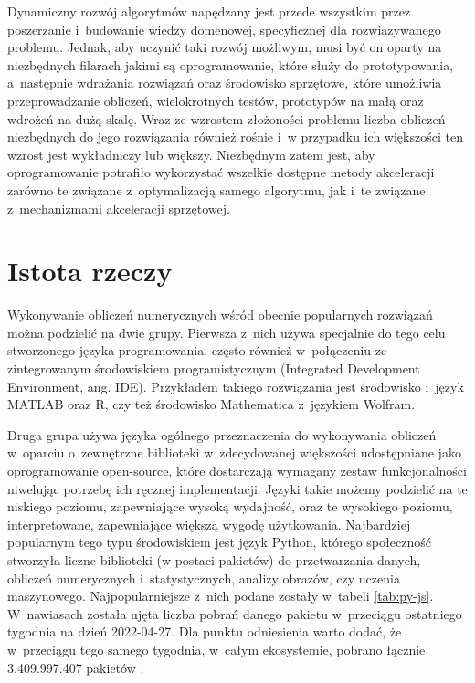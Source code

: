 Dynamiczny rozwój algorytmów napędzany jest przede wszystkim przez poszerzanie i~budowanie wiedzy domenowej, specyficznej dla rozwiązywanego problemu. Jednak, aby uczynić taki rozwój możliwym, musi być on oparty na niezbędnych filarach jakimi są oprogramowanie, które służy do prototypowania, a~następnie wdrażania rozwiązań oraz środowisko sprzętowe, które umożliwia przeprowadzanie obliczeń, wielokrotnych testów, prototypów na małą oraz wdrożeń na dużą skalę. Wraz ze wzrostem złożoności problemu liczba obliczeń niezbędnych do jego rozwiązania również rośnie i~w przypadku ich większości ten wzrost jest wykładniczy lub większy. Niezbędnym zatem jest, aby oprogramowanie potrafiło wykorzystać wszelkie dostępne metody akceleracji zarówno te związane z~optymalizacją samego algorytmu, jak i~te związane z~mechanizmami akceleracji sprzętowej.

\section{Istota rzeczy}

Wykonywanie obliczeń numerycznych wśród obecnie popularnych rozwiązań można podzielić na dwie grupy. Pierwsza z~nich używa specjalnie do tego celu stworzonego języka programowania, często również w~połączeniu ze zintegrowanym środowiskiem programistycznym (Integrated Development Environment, ang. IDE). Przykładem takiego rozwiązania jest środowisko i~język MATLAB\cite{matlab} oraz R\cite{r}, czy też środowisko Mathematica z~językiem Wolfram\cite{mathematica}.

Druga grupa używa języka ogólnego przeznaczenia do wykonywania obliczeń w~oparciu o~zewnętrzne biblioteki w~zdecydowanej większości udostępniane jako oprogramowanie open-source, które dostarczają wymagany zestaw funkcjonalności niwelując potrzebę ich ręcznej implementacji. Języki takie możemy podzielić na te niskiego poziomu, zapewniające wysoką wydajność, oraz te wysokiego poziomu, interpretowane, zapewniające większą wygodę użytkowania. Najbardziej popularnym tego typu środowiskiem jest język Python, którego społeczność stworzyła liczne biblioteki (w postaci pakietów) do przetwarzania danych, obliczeń numerycznych i~statystycznych, analizy obrazów, czy uczenia maszynowego. Najpopularniejsze z~nich podane zostały w~tabeli \ref{tab:py-js}. W~nawiasach została ujęta liczba pobrań danego pakietu w~przeciągu ostatniego tygodnia na dzień 2022-04-27. Dla punktu odniesienia warto dodać, że w~przeciągu tego samego tygodnia, w~całym ekosystemie, pobrano łącznie 3.409.997.407 pakietów \cite{pypi-stats}.

